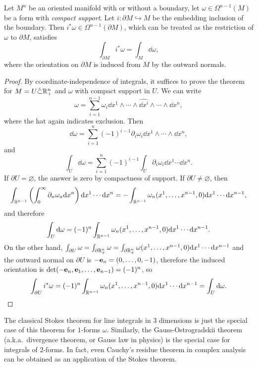 \begin{thm}[Stokes]
    Let $M^n$ be an oriented manifold with or without a boundary, let $\omega\in \Omega^{n-1}(M)$ be a form with \emph{compact support}. Let $i:\partial M\hookrightarrow M$ be the embedding inclusion of the boundary. Then $i^\ast\omega\in\Omega^{n-1}(\partial M)$, which can be treated as the restriction of $\omega$  to $\partial M$, satisfies
    \[\int_{\partial M}i^\ast \omega=\int_M \dd \omega,\]
    where the orientation on $\partial M$ is induced from $M$ by the outward normals.
\end{thm}
\begin{proof}
    By coordinate-independence of integrals, it suffices to prove the theorem for $M=U\mathring\subset \bbR^n_+$ and $\omega$ with compact support in $U$. We can write
    \[\omega=\sum_{i=1}^{n-1}\omega_i \dd x^1\wedge\cdots \wedge \widehat{\dd x^i}\wedge \cdots\wedge \dd x^n,\]
    where the hat again indicates exclusion. Then
    \[\dd \omega=\sum_{i=1}^n (-1)^{i-1}\partial_i\omega_i \dd x^1\wedge\cdots\wedge\dd x^n,\]
    and 
    \[\int_U \dd\omega=\sum_{i=1}^n(-1)^{i-1}\int_U \partial_i\omega_i\dd x^1\cdots\dd x^n.\]
    If $\partial U=\varnothing$, the answer is zero by compactness of support. If $\partial U\neq\varnothing$, then
    \[\int_{\bbR^{n-1}}\left(\int_0^\infty \partial_n\omega_n\dd x^n\right)\dd x^1\cdots\dd x^n=-\int_{\bbR^{n-1}}\omega_n(x^1,\ldots,x^{n-1},0)\dd x^1\cdots\dd x^{n-1},\]
    and therefore 
    \[\int_U \dd\omega=(-1)^n\int_{\bbR^{n-1}}\omega_n(x^1,\ldots,x^{n-1},0)\dd x^1\cdots\dd x^{n-1}.\]
    On the other hand, $\int_{\partial U}\omega=\int_{\partial \bbR^n_+}\omega=\int_{\partial \bbR^n_+}\omega(x^1,\ldots,x^{n-1},0)\dd x^1\cdots \dd x^{n-1}$ and the outward normal on $\partial U$ is $-\bf{e}_n=(0,\ldots,0,-1)$, therefore the induced orientation is $\det(-\bf{e}_n,\bf{e}_1,\ldots,\bf{e}_{n-1})=(-1)^n$, so
    \[\int_{\partial U}i^\ast\omega=(-1)^{n}\int_{\bbR^{n-1}}\omega_n(x^1,\ldots,x^{n-1},0)\dd x^1\cdots\dd x^{n-1}=\int_U \dd\omega.\]
\end{proof}
\begin{rem}
    The classical Stokes theorem for line integrals in $3$ dimensions is just the special case of this theorem for $1$-forms $\omega$. Similarly, the Gauss-Ostrogradskii theorem (a.k.a.\ divergence theorem, or Gauss law in physics) is the special case for integrals of $2$-forms. In fact, even Cauchy's residue theorem in complex analysis can be obtained as an application of the Stokes theorem.
\end{rem}

